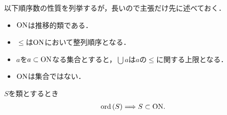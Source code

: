 	以下順序数の性質を列挙するが，長いので主張だけ先に述べておく．
	\begin{itemize}
		\item $\mathrm{ON}$は推移的類である．
		\item $\leq$は$\mathrm{ON}$において整列順序となる．
		\item $a$を$a \subset \mathrm{ON}$なる集合とすると，$\bigcup a$は$a$の$\leq$に関する上限となる．
		\item $\mathrm{ON}$は集合ではない．
	\end{itemize}
	
	\begin{screen}
		\begin{thm}
		\label{thm:transitive_totally_ordered_class_is_contained_in_ON}
			$S$を類とするとき
			\begin{align}
				\operatorname*{ord} \left(S\right) \Longrightarrow S \subset \mathrm{ON}.
			\end{align}
		\end{thm}
	\end{screen}
	
